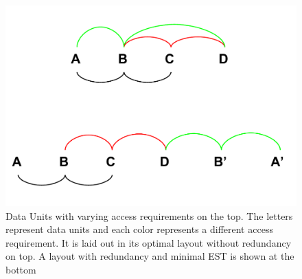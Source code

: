 \begin{figure}[h!]
\centering
\includegraphics[width=\columnwidth]{DataLayoutPaper_TheoryLayouts.pdf}
\caption{Data Units with varying access requirements on the top. The letters represent data units and each color represents a different access requirement. It is laid out in its optimal layout without redundancy on top. A layout with redundancy and minimal EST is shown at the bottom}
\label{fig:startingProb}
\end{figure}

